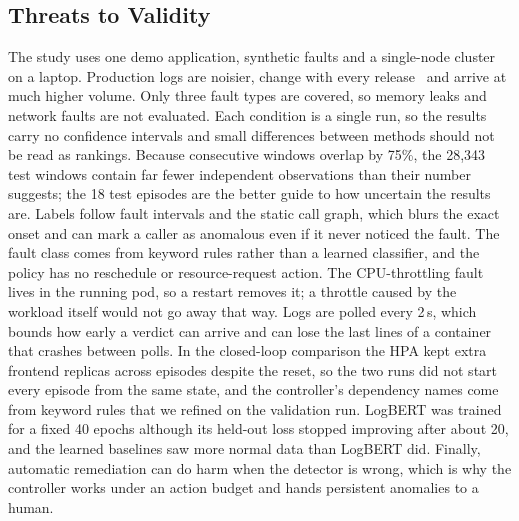 \documentclass[journal]{IEEEtran}
\begin{document}
\subsection{Threats to Validity}
The study uses one demo application, synthetic faults and a single-node cluster on a laptop. Production logs are noisier, change with every release~\cite{zhang2019} and arrive at much higher volume. Only three fault types are covered, so memory leaks and network faults are not evaluated. Each condition is a single run, so the results carry no confidence intervals and small differences between methods should not be read as rankings. Because consecutive windows overlap by 75\%, the 28,343 test windows contain far fewer independent observations than their number suggests; the 18 test episodes are the better guide to how uncertain the results are. Labels follow fault intervals and the static call graph, which blurs the exact onset and can mark a caller as anomalous even if it never noticed the fault. The fault class comes from keyword rules rather than a learned classifier, and the policy has no reschedule or resource-request action. The CPU-throttling fault lives in the running pod, so a restart removes it; a throttle caused by the workload itself would not go away that way. Logs are polled every 2\,s, which bounds how early a verdict can arrive and can lose the last lines of a container that crashes between polls. In the closed-loop comparison the HPA kept extra frontend replicas across episodes despite the reset, so the two runs did not start every episode from the same state, and the controller's dependency names come from keyword rules that we refined on the validation run. LogBERT was trained for a fixed 40 epochs although its held-out loss stopped improving after about 20, and the learned baselines saw more normal data than LogBERT did. Finally, automatic remediation can do harm when the detector is wrong, which is why the controller works under an action budget and hands persistent anomalies to a human.
\end{document}
